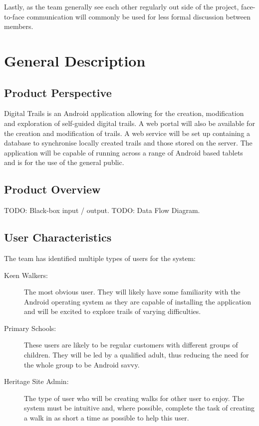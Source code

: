 \documentclass[11pt,a4paper]{article}
\begin{document}
Lastly, as the team generally see each other regularly out side of the project, face-to-face communication will commonly be used for less formal discussion between members. 

\section{General Description}
\label{sec:gen-desc}

\subsection{Product Perspective}
\label{sec:product-perspective}
Digital Trails is an Android application  allowing for the creation, modification and exploration of self-guided digital trails. A web portal will also be available for the creation and modification of trails. A web service will be set up containing a database to synchronise locally created trails and those stored on the server. The application will be capable of running across a range of Android based tablets and is for the use of the general public.

\subsection{Product Overview}
\label{sec:product-overview}
TODO: Black-box input / output.
TODO: Data Flow Diagram.

\subsection{User Characteristics}
\label{sec:user-characteristics}

The team has identified multiple types of users for the system:
\begin{description}
\item[Keen Walkers:] The most obvious user. They will likely have some familiarity with the Android operating system as they are capable of installing the application and will be excited to explore trails of varying difficulties.
\item[Primary Schools:] These users are likely to be regular customers with different groups of children. They will be led by a qualified adult, thus reducing the need for the whole group to be Android savvy.
\item[Heritage Site Admin:] The type of user who will be creating walks for other user to enjoy. The system must be intuitive and, where possible, complete the task of creating a walk in as short a time as possible to help this user.
\end{description}
\end{document}
